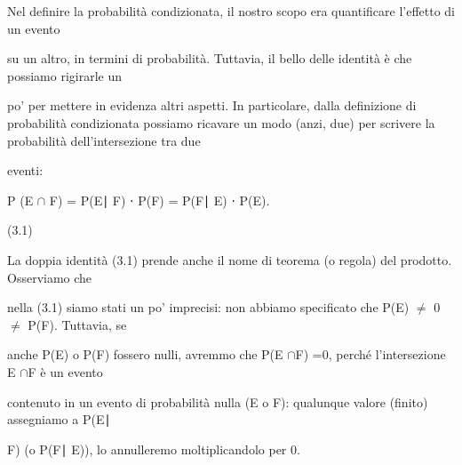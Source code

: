 \documentclass[a4paper,portrait,12pt]{article}
\begin{document}
\begin{flushleft}
Nel definire la probabilit\`{a} condizionata, il nostro scopo era quantificare l'effetto di un evento
\end{flushleft}


\begin{flushleft}
su un altro, in termini di probabilit\`{a}. Tuttavia, il bello delle identit\`{a} \`{e} che possiamo rigirarle un
\end{flushleft}


\begin{flushleft}
po' per mettere in evidenza altri aspetti. In particolare, dalla definizione di probabilit\`{a} condizionata possiamo ricavare un modo (anzi, due) per scrivere la probabilit\`{a} dell'intersezione tra due
\end{flushleft}


\begin{flushleft}
eventi:
\end{flushleft}


\begin{flushleft}
P (E $\cap$ F) = P(E∣ F) ⋅ P(F) = P(F∣ E) ⋅ P(E).
\end{flushleft}





(3.1)





\begin{flushleft}
La doppia identit\`{a} (3.1) prende anche il nome di teorema (o regola) del prodotto. Osserviamo che
\end{flushleft}


\begin{flushleft}
nella (3.1) siamo stati un po' imprecisi: non abbiamo specificato che P(E) $\neq$ 0 $\neq$ P(F). Tuttavia, se
\end{flushleft}


\begin{flushleft}
anche P(E) o P(F) fossero nulli, avremmo che P(E $\cap$F) =0, perch\'{e} l'intersezione E $\cap$F \`{e} un evento
\end{flushleft}


\begin{flushleft}
contenuto in un evento di probabilit\`{a} nulla (E o F): qualunque valore (finito) assegniamo a P(E∣
\end{flushleft}


\begin{flushleft}
F) (o P(F∣ E)), lo annulleremo moltiplicandolo per 0.
\end{flushleft}
\end{document}
